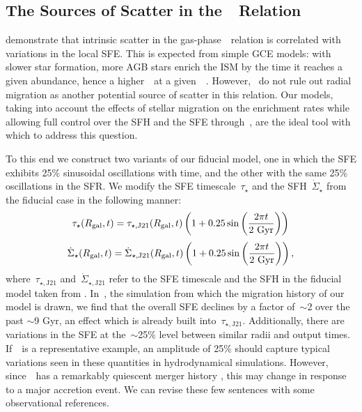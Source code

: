 \documentclass[ms.tex]{subfiles}
\begin{document}
\subsection{The Sources of Scatter in the~\ohno~Relation}
\label{sec:results:schaefer_comp}

\citet{Schaefer2020} demonstrate that intrinsic scatter in the
gas-phase~\ohno~relation is correlated with variations in the local SFE.
This is expected from simple GCE models: with slower star formation, more AGB
stars enrich the ISM by the time it reaches a given abundance, hence a
higher~\no~at a given~\oh~\citep[e.g.][]{Molla2006, Vincenzo2016a}.
However,~\citet{Schaefer2020} do not rule out radial migration as another
potential source of scatter in this relation.
Our models, taking into account the effects of stellar migration on the
enrichment rates while allowing full control over the SFH and the SFE
through~\vice, are the ideal tool with which to address this question.
\par
To this end we construct two variants of our fiducial model, one in which the
SFE exhibits 25\% sinusoidal oscillations with time, and the other with the
same 25\% oscillations in the SFR.
We modify the SFE timescale~$\tau_\star$ and the SFH~$\dot{\Sigma}_\star$ from
the fiducial case in the following manner:
\begin{equation}
\tau_\star(R_\text{gal}, t) = \tau_{\star,\text{J21}}(R_\text{gal}, t)
\left(1 + 0.25\sin\left(\frac{2\pi t}{2~\text{Gyr}}\right)\right)
\label{eq:sfe_var}
\end{equation}
\begin{equation}
\dot{\Sigma}_\star(R_\text{gal}, t) = \dot{\Sigma}_{\star,\text{J21}}(R_\text{gal}, t)
\left(1 + 0.25\sin\left(\frac{2\pi t}{2~\text{Gyr}}\right)\right),
\label{eq:sfr_var}
\end{equation}
where~$\tau_{\star,\text{J21}}$ and~$\dot{\Sigma}_{\star,\text{J21}}$ refer to
the SFE timescale and the SFH in the fiducial model taken from
\citet{Johnson2021}.
In~\hsim, the simulation from which the migration history of our model is drawn,
we find that the overall SFE declines by a factor of~$\sim$2 over the past
$\sim$9 Gyr, an effect which is already built into~$\tau_{\star,\text{J21}}$.
Additionally, there are variations in the SFE at the~$\sim$25\% level between
similar radii and output times.
If~\hsim~is a representative example, an amplitude of 25\% should capture
typical variations seen in these quantities in hydrodynamical simulations.
However, since~\hsim~has a remarkably quiescent merger history
\citep{Zolotov2012}, this may change in response to a major accretion event.
{\color{red} We can revise these few sentences with some observational
references.}
\end{document}
